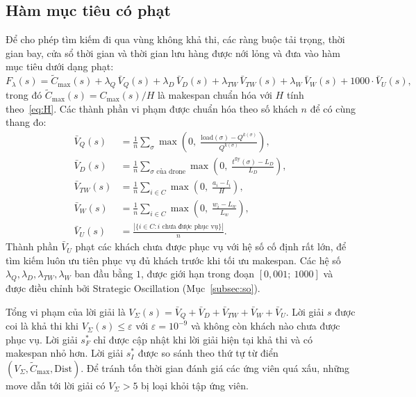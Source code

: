 \documentclass[../DoAn.tex]{subfiles}
\begin{document}
\subsection{Hàm mục tiêu có phạt}

Để cho phép tìm kiếm đi qua vùng không khả thi, các ràng buộc tải trọng, thời gian bay, cửa sổ thời gian và thời gian lưu hàng được nới lỏng và đưa vào hàm mục tiêu dưới dạng phạt:
\begin{equation}
F_\lambda(s) = \tilde{C}_{\max}(s)
             + \lambda_Q\, \bar{V}_Q(s)
             + \lambda_D\, \bar{V}_D(s)
             + \lambda_{TW}\, \bar{V}_{TW}(s)
             + \lambda_W\, \bar{V}_W(s)
             + 1000\cdot \bar{V}_{U}(s),
\label{eq:objective}
\end{equation}
trong đó $\tilde{C}_{\max}(s) = C_{\max}(s)/H$ là makespan chuẩn hóa với $H$ tính theo~\eqref{eq:H}. Các thành phần vi phạm được chuẩn hóa theo số khách $n$ để có cùng thang đo:
\begin{align}
\bar{V}_Q(s) &= \frac{1}{n}\sum_{\sigma}\max\!\left(0,\;\frac{\mathrm{load}(\sigma) - Q^{k(\sigma)}}{Q^{k(\sigma)}}\right), \\
\bar{V}_D(s) &= \frac{1}{n}\sum_{\sigma \text{ của drone}}\max\!\left(0,\;\frac{t^{\mathrm{fly}}(\sigma) - L_D}{L_D}\right), \\
\bar{V}_{TW}(s) &= \frac{1}{n}\sum_{i\in C}\max\!\left(0,\;\frac{a_i - l_i}{H}\right), \\
\bar{V}_W(s) &= \frac{1}{n}\sum_{i\in C}\max\!\left(0,\;\frac{w_i - L_w}{L_w}\right), \\
\bar{V}_{U}(s) &= \frac{\left|\{i \in C : i \text{ chưa được phục vụ}\}\right|}{n}.
\end{align}
Thành phần $\bar{V}_U$ phạt các khách chưa được phục vụ với hệ số cố định rất lớn, để tìm kiếm luôn ưu tiên phục vụ đủ khách trước khi tối ưu makespan. Các hệ số $\lambda_Q, \lambda_D, \lambda_{TW}, \lambda_W$ ban đầu bằng $1$, được giới hạn trong đoạn $[0{,}001;\ 1000]$ và được điều chỉnh bởi Strategic Oscillation (Mục~\ref{subsec:so}).

Tổng vi phạm của lời giải là $V_\Sigma(s) = \bar{V}_Q + \bar{V}_D + \bar{V}_{TW} + \bar{V}_W + \bar{V}_U$. Lời giải $s$ được coi là khả thi khi $V_\Sigma(s) \leq \varepsilon$ với $\varepsilon = 10^{-9}$ và không còn khách nào chưa được phục vụ. Lời giải $s^*_F$ chỉ được cập nhật khi lời giải hiện tại khả thi và có makespan nhỏ hơn. Lời giải $s^*_I$ được so sánh theo thứ tự từ điển $(V_\Sigma, \tilde{C}_{\max}, \mathrm{Dist})$. Để tránh tốn thời gian đánh giá các ứng viên quá xấu, những move dẫn tới lời giải có $V_\Sigma > 5$ bị loại khỏi tập ứng viên.
\end{document}

